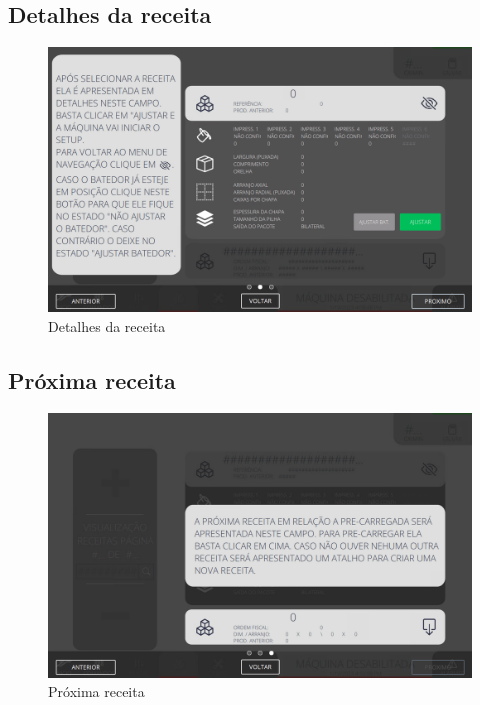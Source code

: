 \thispagestyle{fancy}
\vspace{\fill}
\subsection{\small Detalhes da receita}
\begin{figure}
    \centering
    \includegraphics[width=576 px,height=360 px]{src/imagesICV/09-request/visualization/e-5.png}
    \caption{Detalhes da receita}
\end{figure}
\newpage

\thispagestyle{fancy}
\vspace{\fill}
\subsection{\small Próxima receita}
\begin{figure}
    \centering
    \includegraphics[width=576 px,height=360 px]{src/imagesICV/09-request/visualization/e-6.png}
    \caption{Próxima receita}
\end{figure}
